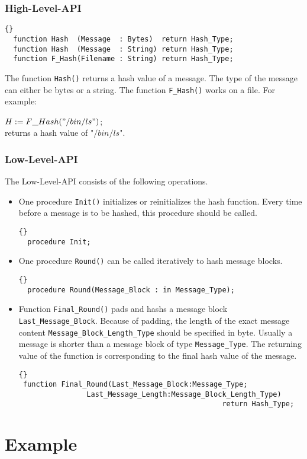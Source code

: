 \subsubsection*{High-Level-API}
\begin{lstlisting}{}
  function Hash  (Message  : Bytes)  return Hash_Type;
  function Hash  (Message  : String) return Hash_Type;
  function F_Hash(Filename : String) return Hash_Type;
\end{lstlisting}
The function \texttt{Hash()} returns a hash value of a message. The type of the message can either be bytes or a string. The function \texttt{F\_Hash()} works on a file. For example:

$H:=F\_Hash("/bin/ls")$;\\
returns a hash value of "$/bin/ls$".
\subsubsection*{Low-Level-API}
The Low-Level-API consists of the following operations.
\begin{itemize}
\item One procedure \texttt{Init()} initializes or reinitializes the hash function. Every time before a message is to be hashed, this procedure should be called.
\begin{lstlisting}{}
  procedure Init;
\end{lstlisting}
\item One procedure \texttt{Round()} can be called iteratively to hash message blocks.
\begin{lstlisting}{}
  procedure Round(Message_Block : in Message_Type);
\end{lstlisting}
\item Function \texttt{Final\_Round()} pads and hashs a message block \texttt{Last\_Message\_Block}. Because of padding, the length of the exact message content \texttt{Message\_Block\_Length\_Type} should be specified in byte. Usually a message is shorter than a message block of type \texttt{Message\_Type}. The returning value of the function is corresponding to the final hash value of the message.
\begin{lstlisting}{}
 function Final_Round(Last_Message_Block:Message_Type;
        	    Last_Message_Length:Message_Block_Length_Type) 
        			 	  			 			return Hash_Type;
\end{lstlisting}
\end{itemize}
\section{Example}
